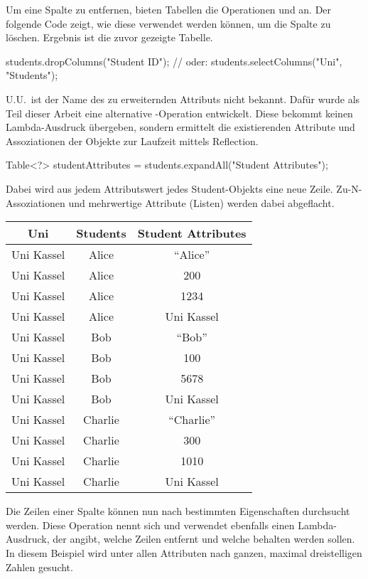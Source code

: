 Um eine Spalte zu entfernen, bieten Tabellen die Operationen  und  an.
Der folgende Code zeigt, wie diese verwendet werden können, um die Spalte  zu löschen.
Ergebnis ist die zuvor gezeigte Tabelle.

\begin{jcodeblock}
    students.dropColumns("Student ID");
    // oder:
    students.selectColumns("Uni", "Students");
\end{jcodeblock}

U.U.\ ist der Name des zu erweiternden Attributs nicht bekannt.
Dafür wurde als Teil dieser Arbeit eine alternative -Operation entwickelt.
Diese bekommt keinen Lambda-Ausdruck übergeben, sondern ermittelt die existierenden Attribute und Assoziationen der Objekte zur Laufzeit mittels Reflection.

\begin{jcodeblock}
    Table<?> studentAttributes = students.expandAll("Student Attributes");
\end{jcodeblock}

Dabei wird aus jedem Attributswert jedes Student-Objekts eine neue Zeile.
Zu-N-Assoziationen und mehrwertige Attribute (Listen) werden dabei abgeflacht.

\begin{tabular}{|c|c|c|}
    \hline
    \textbf{Uni} & \textbf{Students} & \textbf{Student Attributes} \\
    \hline
    Uni Kassel & Alice   & ``Alice'' \\
    Uni Kassel & Alice   & 200  \\
    Uni Kassel & Alice   & 1234  \\
    Uni Kassel & Alice   & Uni Kassel  \\
    Uni Kassel & Bob     & ``Bob'' \\
    Uni Kassel & Bob     & 100  \\
    Uni Kassel & Bob     & 5678  \\
    Uni Kassel & Bob     & Uni Kassel  \\
    Uni Kassel & Charlie & ``Charlie'' \\
    Uni Kassel & Charlie & 300  \\
    Uni Kassel & Charlie & 1010  \\
    Uni Kassel & Charlie & Uni Kassel  \\
    \hline
\end{tabular}

Die Zeilen einer Spalte können nun nach bestimmten Eigenschaften durchsucht werden.
Diese Operation nennt sich  und verwendet ebenfalls einen Lambda-Ausdruck,
der angibt, welche Zeilen entfernt und welche behalten werden sollen.
In diesem Beispiel wird unter allen Attributen nach ganzen, maximal dreistelligen Zahlen gesucht.

